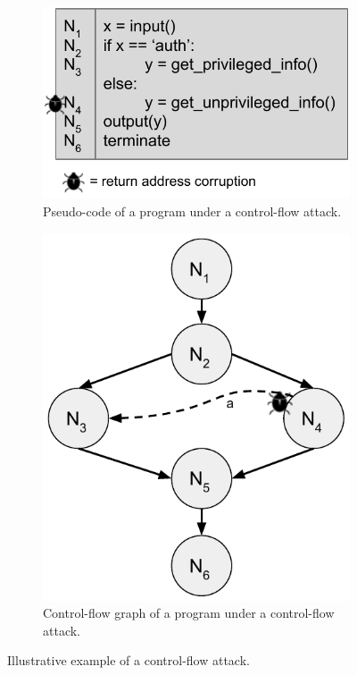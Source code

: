 \begin{figure}[t]
	\centering
	\begin{subfigure}[t]{0.45\textwidth}
		\centering
		\includegraphics[width=\linewidth]{fig_c4/problem-setting-code.pdf}
		\caption{Pseudo-code of a program under a control-flow attack.}
		\label{fig:problem-setting-code}
	\end{subfigure}
	\hfill
	\begin{subfigure}[t]{0.4\textwidth}
		\centering
		\includegraphics[width=\linewidth]{fig_c4/problem-setting-graph.pdf}
		\caption{Control-flow graph of a program under a control-flow attack.}
		\label{fig:problem-setting-graph}
	\end{subfigure}
	\caption[Example of control-flow attack.]{Illustrative example of a 
	control-flow attack.}
	\label{fig:problem-setting}
\end{figure}

